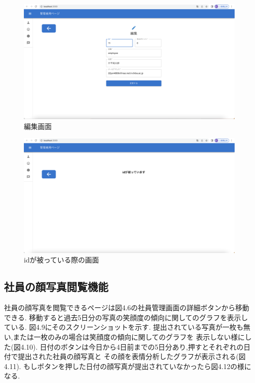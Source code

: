 \begin{figure}[!h]
	\begin{center}
			\includegraphics[scale=0.3, clip]{./img/sample7.png}
			\caption{編集画面}
			\label{fig:図の名前}
	\end{center}
\end{figure}

\clearpage

\begin{figure}[!h]
	\begin{center}
			\includegraphics[scale=0.3, clip]{./img/sample8.png}
			\caption{idが被っている際の画面}
			\label{fig:図の名前}
	\end{center}
\end{figure}

\subsection{社員の顔写真閲覧機能}
社員の顔写真を閲覧できるページは図4.6の社員管理画面の詳細ボタンから移動できる.
移動すると過去5日分の写真の笑顔度の傾向に関してのグラフを表示している.
図4.9にそのスクリーンショットを示す.
提出されている写真が一枚も無い,または一枚のみの場合は笑顔度の傾向に関してのグラフを
表示しない様にした(図4.10).
日付のボタンは今日から4日前までの5日分あり,押すとそれぞれの日付で提出された社員の顔写真と
その顔を表情分析したグラフが表示される(図4.11).
もしボタンを押した日付の顔写真が提出されていなかったら図4.12の様になる.

